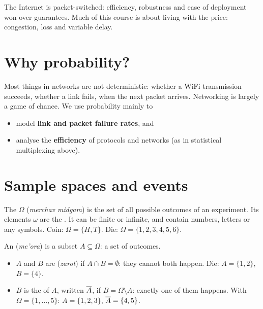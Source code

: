 \begin{intuition}
The Internet is packet-switched: efficiency, robustness and ease of deployment won over guarantees. Much of this course is about living with the
price: congestion, loss and variable delay.
\end{intuition}


\section{Why probability?}

Most things in networks are not deterministic: whether a WiFi transmission succeeds, whether a link fails, when the next packet arrives.
Networking is largely a game of chance. We use probability mainly to
\begin{itemize}
  \item model \textbf{link and packet failure rates}, and
  \item analyse the \textbf{efficiency} of protocols and networks (as in statistical multiplexing above).
\end{itemize}

\section{Sample spaces and events}

\begin{defn}
The  $\Omega$ (\emph{merchav midgam}) is the set of all possible outcomes of an experiment. Its elements $\omega$ are the .
It can be finite or infinite, and contain numbers, letters or any symbols.
Coin: $\Omega=\{H,T\}$. Die: $\Omega=\{1,2,3,4,5,6\}$.
\end{defn}

\begin{defn}
An  (\emph{me'ora}) is a subset $A\subseteq\Omega$: a set of outcomes.
\begin{itemize}
  \item $A$ and $B$ are  (\emph{zarot}) if $A\cap B=\emptyset$: they cannot both happen. Die: $A=\{1,2\}$, $B=\{4\}$.
  \item $B$ is the  of $A$, written $\overline{A}$, if $B=\Omega\setminus A$: exactly one of them happens. With $\Omega=\{1,\dots,5\}$: $A=\{1,2,3\}$, $\overline{A}=\{4,5\}$.
\end{itemize}
\end{defn}

